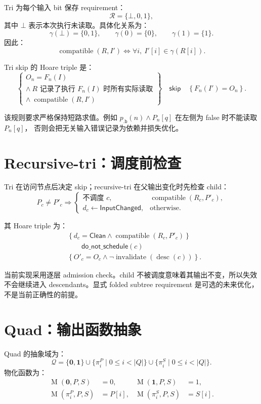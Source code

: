 \documentclass[UTF8,11pt]{ctexart}
\newcommand{\Clean}{\ensuremath{\mathsf{Clean}}}
\newcommand{\InputChanged}{\ensuremath{\mathsf{InputChanged}}}
\newcommand{\compat}{\ensuremath{\operatorname{compatible}}}
\newcommand{\mat}{\ensuremath{\operatorname{M}}}
\begin{document}
Tri 为每个输入 bit 保存 requirement：
\[
\mathcal R=\{\bot,0,1\},
\]
其中 $\bot$ 表示本次执行未读取。具体化关系为：
\[
\gamma(\bot)=\{0,1\},\qquad
\gamma(0)=\{0\},\qquad
\gamma(1)=\{1\}.
\]
因此：
\[
\compat(R,I')\iff\forall i,\ I'[i]\in\gamma(R[i]).
\]

Tri skip 的 Hoare triple 是：
\[
\left\{
\begin{array}{l}
O_n=F_n(I)\\
\land\ R\text{ 记录了执行 }F_n(I)\text{ 时所有实际读取}\\
\land\ \compat(R,I')
\end{array}
\right\}
\quad\mathsf{skip}\quad
\left\{F_n(I')=O_n\right\}.
\]

该规则要求严格保持短路求值。例如
$p_{\mathtt{.b}}(n)\land P_n[q]$ 在左侧为 false 时不能读取 $P_n[q]$，
否则会把无关输入错误记录为依赖并损失优化。

\section{Recursive-tri：调度前检查}

Tri 在访问节点后决定 skip；recursive-tri 在父输出变化时先检查 child：
\[
P_c\ne P'_c\Longrightarrow
\begin{cases}
\text{不调度 }c,&\compat(R_c,P'_c),\\
d_c\gets\InputChanged,&\text{otherwise}.
\end{cases}
\]

其 Hoare triple 为：
\[
\begin{aligned}
&\left\{d_c=\Clean\land\compat(R_c,P'_c)\right\}\\
&\qquad\mathsf{do\_not\_schedule}(c)\\
&\left\{O'_c=O_c\land
\neg\operatorname{invalidate}(\operatorname{desc}(c))\right\}.
\end{aligned}
\]

当前实现采用逐层 admission check。child 不被调度意味着其输出不变，所以失效
不会继续进入 descendants。显式 folded subtree requirement 是可选的未来优化，
不是当前正确性的前提。

\section{Quad：输出函数抽象}

Quad 的抽象域为：
\[
\mathcal Q=\{\mathbf0,\mathbf1\}
\cup\{\pi^P_i\mid 0\le i<|Q|\}
\cup\{\pi^S_i\mid 0\le i<|Q|\}.
\]
物化函数为：
\[
\begin{aligned}
\mat(\mathbf0,P,S)&=0,&\mat(\mathbf1,P,S)&=1,\\
\mat(\pi^P_i,P,S)&=P[i],&\mat(\pi^S_i,P,S)&=S[i].
\end{aligned}
\]
\end{document}
